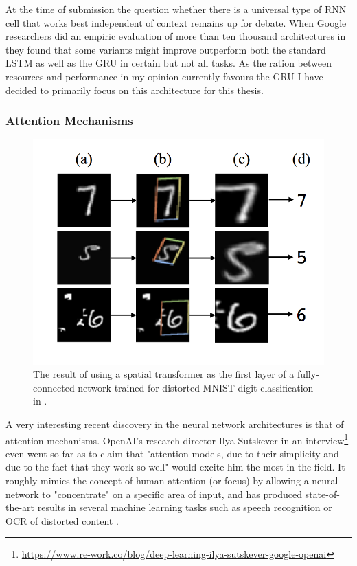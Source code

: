 At the time of submission the question whether there is a universal type of RNN cell that works best independent of context remains up for debate. When Google researchers did an empiric evaluation of more than ten thousand architectures in \cite{45473} they found that some variants might improve outperform both the standard LSTM as well as the GRU in certain but not all tasks. As the ration between resources and performance in my opinion currently favours the GRU I have decided to primarily focus on this architecture for this thesis.



\subsubsection{Attention Mechanisms}

\begin{figure}[h]
    \centering
	\includegraphics[width=.65\textwidth]{./images/illustrations/attention}
    \caption{The result of using a spatial transformer as the
first layer of a fully-connected network trained for distorted
MNIST digit classification in \cite{DBLP:journals/corr/JaderbergSZK15}.}
    \label{fig:attention}
\end{figure}


A very interesting recent discovery in the neural network architectures is that of attention mechanisms. OpenAI's research director Ilya Sutskever in an interview\footnote{\url{https://www.re-work.co/blog/deep-learning-ilya-sutskever-google-openai}} even went so far as to claim that "attention models, due to their simplicity and due to the fact that they work so well" would excite him the most in the field. It roughly mimics the concept of human attention (or focus) by allowing a neural network to "concentrate" on a specific area of input, and has produced state-of-the-art results in several machine learning tasks such as speech recognition or OCR of distorted content \cite{DBLP:journals/corr/JaderbergSZK15}. 

